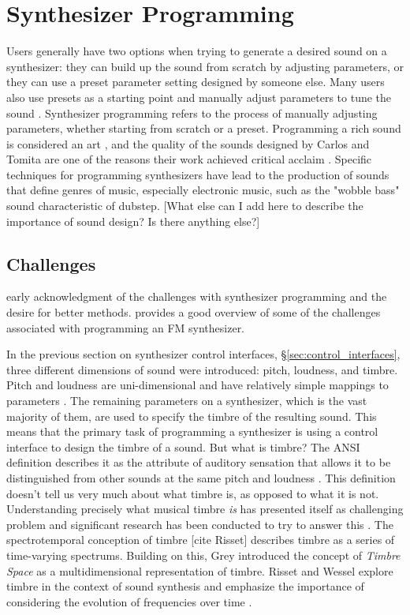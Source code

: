 \section{Synthesizer Programming}
Users generally have two options when trying to generate a desired sound on a synthesizer: they can build up the sound from scratch by adjusting parameters, or they can use a preset parameter setting designed by someone else. Many users also use presets as a starting point and manually adjust parameters to tune the sound \cite{krekovic2019insights}. Synthesizer programming refers to the process of manually adjusting parameters, whether starting from scratch or a preset. Programming a rich sound is considered an art \cite{russ2012sound}, and the quality of the sounds designed by Carlos and Tomita are one of the reasons their work achieved critical acclaim \cite{jenkins2019analog}. Specific techniques for programming synthesizers have lead to the production of sounds that define genres of music, especially electronic music, such as the "wobble bass" sound characteristic of dubstep. [What else can I add here to describe the importance of sound design? Is there anything else?]

\subsection{Challenges}
\cite{justice1979analytic} early acknowledgment of the challenges with synthesizer programming and the desire for better methods. \cite{ashley1986knowledge} provides a good overview of some of the challenges associated with programming an FM synthesizer.

In the previous section on synthesizer control interfaces, \S\ref{sec:control_interfaces}, three different dimensions of sound were introduced: pitch, loudness, and timbre. Pitch and loudness are uni-dimensional and have relatively simple mappings to parameters \cite{seago2004critical}. The remaining parameters on a synthesizer, which is the vast majority of them, are used to specify the timbre of the resulting sound. This means that the primary task of programming a synthesizer is using a control interface to design the timbre of a sound. But what is timbre? The ANSI definition describes it as the attribute of auditory sensation that allows it to be distinguished from other sounds at the same pitch and loudness \cite{american1973american}. This definition doesn't tell us very much about what timbre is, as opposed to what it is not. Understanding precisely what musical timbre \textit{is} has presented itself as challenging problem \cite{krumhansl1989musical} and significant research has been conducted to try to answer this \cite{McAdams2019}. The spectrotemporal conception of timbre [cite Risset] describes timbre as a series of time-varying spectrums. Building on this, Grey introduced the concept of \textit{Timbre Space} \cite{grey1977multidimensional} as a multidimensional representation of timbre. Risset and Wessel explore timbre in the context of sound synthesis and emphasize the importance of considering the evolution of frequencies over time \cite{risset1999exploration}. 

